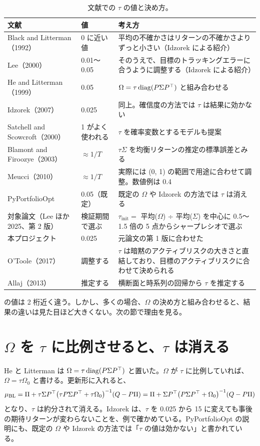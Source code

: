 \begin{table}[htbp]
\centering
\caption{文献での $\tau$ の値と決め方。}
\label{tab:tau-lit}
\small
\begin{tabular}{p{3.8cm}p{2.6cm}p{6.6cm}}
\toprule
文献 & 値 & 考え方 \\
\midrule
Black and Litterman（1992） & 0 に近い値 & 平均の不確かさはリターンの不確かさよりずっと小さい（Idzorek による紹介） \\
Lee（2000） & 0.01〜0.05 & そのうえで、目標のトラッキングエラーに合うように調整する（Idzorek による紹介） \\
He and Litterman（1999） & 0.05 & $\Omega=\tau\operatorname{diag}(P\Sigma P^{\top})$ と組み合わせる \\
Idzorek（2007） & 0.025 & 同上。確信度の方法では $\tau$ は結果に効かない \\
Satchell and Scowcroft（2000） & 1 がよく使われる & $\tau$ を確率変数とするモデルも提案 \\
Blamont and Firoozye（2003） & $\approx1/T$ & $\tau\Sigma$ を均衡リターンの推定の標準誤差とみる \\
Meucci（2010） & $\approx1/T$ & 実際には (0, 1) の範囲で用途に合わせて調整。数値例は 0.4 \\
PyPortfolioOpt & 0.05（既定） & 既定の $\Omega$ や Idzorek の方法では $\tau$ は消える \\
対象論文（Lee ほか 2025、第 2 版） & 検証期間で選ぶ & $\tau_{\mathrm{init}}=$ 平均($\Omega$) ÷ 平均($\Sigma$) を中心に 0.5〜1.5 倍の 5 点からシャープレシオで選ぶ \\
本プロジェクト & 0.025 & 元論文の第 1 版に合わせた \\
O'Toole（2017） & 調整する & $\tau$ は暗黙のアクティブリスクの大きさと直結しており、目標のアクティブリスクに合わせて決められる \\
Allaj（2013） & 推定する & 横断面と時系列の回帰から $\tau$ を推定する \\
\bottomrule
\end{tabular}
\end{table}

 の値は 2 桁近く違う。しかし、多くの場合、$\Omega$ の決め方と組み合わせると、結果の違いは見た目ほど大きくない。次の節で理由を見る。

\section{$\Omega$ を $\tau$ に比例させると、$\tau$ は消える}\label{sec:tau-cancel}

He と Litterman は $\Omega=\tau\operatorname{diag}(P\Sigma P^{\top})$ と置いた。$\Omega$ が $\tau$ に比例していれば、$\Omega=\tau\Omega_0$ と書ける。更新形に入れると、
\begin{equation}
\mu_{\mathrm{BL}}=\Pi+\tau\Sigma P^{\top}\bigl(\tau P\Sigma P^{\top}+\tau\Omega_0\bigr)^{-1}(Q-P\Pi)
=\Pi+\Sigma P^{\top}\bigl(P\Sigma P^{\top}+\Omega_0\bigr)^{-1}(Q-P\Pi)
\label{eq:tau-cancel}
\end{equation}
となり、$\tau$ は約分されて消える。Idzorek は、$\tau$ を 0.025 から 15 に変えても事後の期待リターンが変わらないことを、例で確かめている。PyPortfolioOpt の説明にも、既定の $\Omega$ や Idzorek の方法では「$\tau$ の値は効かない」と書かれている。

